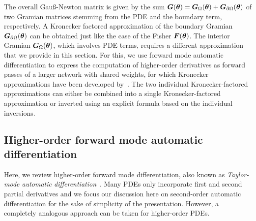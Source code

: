 
The overall Gauß-Newton matrix is given by the sum ${\bm{G}}({\bm{\theta}})= {\bm{G}}_\Omega({\bm{\theta}}) + {\bm{G}}_{\partial\Omega}({\bm{\theta}})$ of two Gramian matrices stemming from the PDE and the boundary term, respectively. 
A Kronecker factored approximation of the boundary Gramian ${\bm{G}}_{\partial\Omega}({\bm{\theta}})$ can be obtained just like the case of the  Fisher ${\bm{F}}({\bm{\theta}})$. 
The interior Gramian ${\bm{G}}_\Omega({\bm{\theta}})$, which involves PDE terms, requires a different approximation that we provide in this section. 
For this, we use forward mode automatic differentiation to express the computation of higher-order derivatives as forward passes of a larger network with shared weights, for which Kronecker approximations have been developed by~\citet{eschenhagen2023kroneckerfactored}. 
The two individual Kronecker-factored approximations can either be combined into a single Kronecker-factored approximation or inverted using an explicit formula based on the individual inversions. 

\subsection{Higher-order forward mode automatic differentiation}
\label{sec:taylor-mode-AD}

Here, we review higher-order forward mode differentiation, also known as \emph{Taylor-mode automatic differentiation}~\citep{griewank1996algorithm, griewank2008evaluating, bettencourt2019taylor}. 
Many PDEs only incorporate first and second partial derivatives and we focus our discussion here on second-order automatic differentiation for the sake of simplicity of the presentation. 
However, a completely analogous approach can be taken for higher-order PDEs. 

